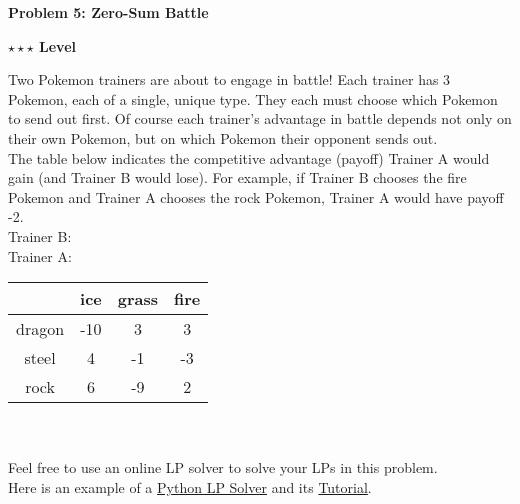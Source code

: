 \documentclass{article}\usepackage[utf8]{inputenc}\usepackage[margin=0.4cm,top=0.4cm,bottom=0.4cm]{geometry}\usepackage[usenames,dvipsnames,svgnames,table]{xcolor}
\newcommand\tab[1][1cm]{\hspace*{#1}}
\begin{document}
\clearpage

\vspace{-2mm}\noindent\begin{mybox}{\begin{center}\textbf{\color{black}Problem 5: Zero-Sum Battle}\end{center}}\end{mybox}\vspace{-2mm}
\begin{myboxot}\noindent\textbf{$\star\star\star$ Level}\end{myboxot} 

\noindent Two Pokemon trainers are about to engage in battle! Each trainer has 3 Pokemon, each of a single, unique type. They each must choose which Pokemon to send out first. Of course each trainer's advantage in battle depends not only on their own Pokemon, but on which Pokemon their opponent sends out.\\
\noindent The table below indicates the competitive advantage (payoff) Trainer A would gain (and Trainer B would lose). For example, if Trainer B chooses the fire Pokemon and Trainer A chooses the rock Pokemon, Trainer A would have payoff -2.\\
\vspace{4pt}
\tab \tab \tab Trainer B:\\
Trainer A:
\begin{tabular}{ c|c|c|c| }
  & ice & grass & fire \\ 
 \hline
 dragon & -10 & 3 & 3 \\ 
 \hline
 steel & 4 & -1 & -3 \\ 
 \hline
 rock & 6 & -9 & 2 \\ 
 \hline
\end{tabular}\\\\
\noindent Feel free to use an online LP solver to solve your LPs in this problem.\\
Here is an example of a \href{https://pypi.python.org/pypi/PuLP/1.1}{Python LP Solver} and its \href{https://pythonhosted.org/PuLP/#pulp-internal-documentation}{Tutorial}.
\vspace{4pt}
\end{document}

